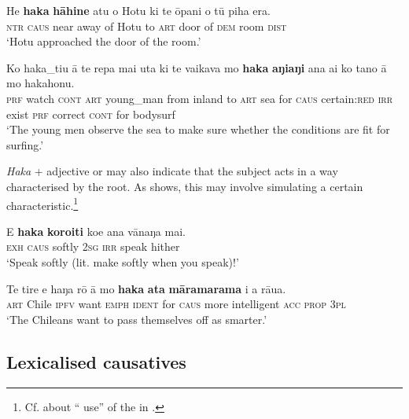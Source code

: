 \ea\label{ex:8.247}
\gll He \textbf{haka} \textbf{hāhine} atu o Hotu ki te {\ꞌ}ōpani o tū piha era. \\
\textsc{ntr} \textsc{caus} near away of Hotu to \textsc{art} door of \textsc{dem} room \textsc{dist} \\

\glt 
‘Hotu approached the door of the room.’ \textstyleExampleref{[R301.121]} 
\z

\ea\label{ex:8.248}
\gll Ko haka\_tiu {\ꞌ}ā te repa mai {\ꞌ}uta ki te vaikava  mo \textbf{haka} \textbf{aŋiaŋi} ana ai ko tano {\ꞌ}ā mo hakahonu.\\
\textsc{prf} watch \textsc{cont} \textsc{art} young\_man from inland to \textsc{art} sea  for \textsc{caus} certain:\textsc{red} \textsc{irr} exist \textsc{prf} correct \textsc{cont} for bodysurf\\

\glt 
‘The young men observe the sea to make sure whether the conditions are fit for surfing.’ \textstyleExampleref{[R431.001]} 
\z

\textit{Haka} + adjective or  may also indicate that the subject acts in a way characterised by the root. As  shows, this may involve simulating a certain characteristic.\footnote{\label{fn:457}Cf. \citet[14]{Moyle2011} about “ use” of the   in .}

\ea\label{ex:8.249}
\gll E \textbf{haka} \textbf{koro{\ꞌ}iti} koe ana vānaŋa mai. \\
\textsc{exh} \textsc{caus} softly \textsc{2sg} \textsc{irr} speak hither \\

\glt 
‘Speak softly (lit. make softly when you speak)!’ \textstyleExampleref{[R408.046]} 
\z

\ea\label{ex:8.250}
\gll Te tire e haŋa rō {\ꞌ}ā mo \textbf{haka} \textbf{{\ꞌ}ata} \textbf{māramarama} i a rāua. \\
\textsc{art} Chile \textsc{ipfv} want \textsc{emph} \textsc{ident} for \textsc{caus} more intelligent \textsc{acc} \textsc{prop} \textsc{3pl} \\

\glt 
‘The Chileans want to pass themselves off as smarter.’ \textstyleExampleref{[R428.006]} 
\z

\subsection{Lexicalised causatives}\label{sec:8.12.5}

